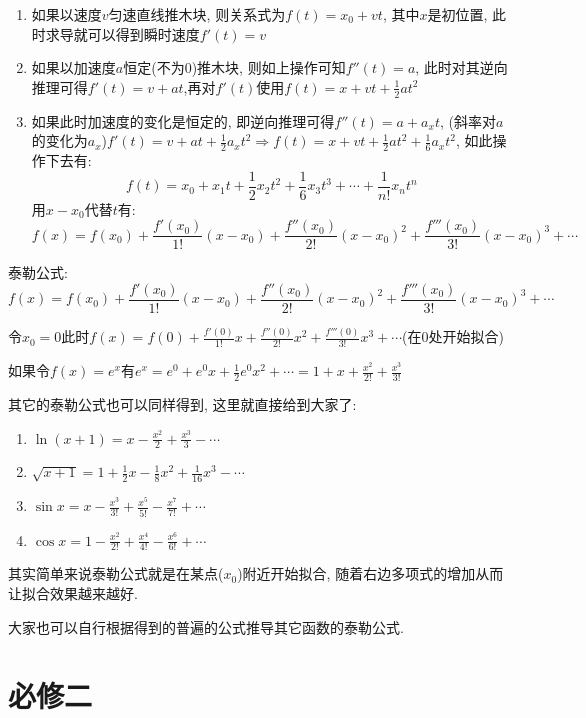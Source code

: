 \documentclass{book}
\begin{document}
    \begin{enumerate}
        \item 如果以速度$v$匀速直线推木块, 则关系式为$f(t)=x_0+vt$, 其中$x$是初位置, 此时求导就可以得到瞬时速度$f'(t)=v$
        \item 如果以加速度$a$恒定(不为0)推木块, 则如上操作可知$f''(t)=a$, 此时对其逆向推理可得$f'(t)=v+at$,再对$\displaystyle f'(t)$使用$\displaystyle f(t) =x+vt+\frac{1}{2}at^2$
        \item 如果此时加速度的变化是恒定的, 即逆向推理可得$\displaystyle f''(t)=a+a_xt$, (斜率对$a$的变化为$a_x$)$\displaystyle f'(t)=v+at+\frac{1}{2}a_xt^2\Longrightarrow f(t)=x+vt+\frac{1}{2}at^2+\frac{1}{6}a_xt^2$, 如此操作下去有: $$f(t)=x_0+x_1t+\frac{1}{2}x_2t^2+\frac{1}{6}x_3t^3+\cdots+\frac{1}{n!}x_nt^n$$用$x-x_0$代替$t$有:$$f(x)=f(x_0)+\frac{f'(x_0)}{1!}(x-x_0)+\frac{f''(x_0)}{2!}(x-x_0)^2+\frac{f'''(x_0)}{3!}(x-x_0)^3+\cdots$$
    \end{enumerate}

    \textcolor[rgb]{0.38,0.11,0.2}{泰勒公式:} $$f(x)=f(x_0)+\frac{f'(x_0)}{1!}(x-x_0)+\frac{f''(x_0)}{2!}(x-x_0)^2+\frac{f'''(x_0)}{3!}(x-x_0)^3+\cdots$$

    令$x_0=0$此时$\displaystyle f(x)=f(0)+\frac{f'(0)}{1!}x+\frac{f''(0)}{2!}x^2+\frac{f'''(0)}{3!}x^3+\cdots$(在0处开始拟合)

    如果令$\displaystyle f(x)=e^x$有$\displaystyle e^x=e^0+e^0x+\frac{1}{2}e^0x^2+\cdots=1+x+\frac{x^2}{2!}+\frac{x^3}{3!}$

    其它的泰勒公式也可以同样得到, 这里就直接给到大家了:

    \begin{enumerate}
        \item $\displaystyle \ln (x+1)=x-\frac{x^2}{2}+\frac{x^3}{3}-\cdots$
        \item $\displaystyle \sqrt{x+1}=1+\frac{1}{2}x-\frac{1}{8}x^2+\frac{1}{16}x^3-\cdots$
        \item $\displaystyle \sin x = x-\frac{x^3}{3!}+\frac{x^5}{5!}-\frac{x^7}{7!}+\cdots$
        \item $\displaystyle \cos x=1-\frac{x^2}{2!}+\frac{x^4}{4!}-\frac{x^6}{6!}+\cdots$
    \end{enumerate}

    其实简单来说泰勒公式就是在某点($x_0$)附近开始拟合, 随着右边多项式的增加从而让拟合效果越来越好.

    大家也可以自行根据得到的普遍的公式推导其它函数的泰勒公式.
    \chapter{必修二}
\end{document}
